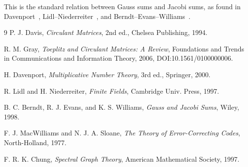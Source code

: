 \documentclass[11pt,a4paper]{article}
\theoremstyle{plain}
\theoremstyle{definition}
\begin{document}
This is the standard relation between Gauss sums and Jacobi sums, as found in
Davenport~\cite[Thm.~11.4]{Davenport}, 
Lidl--Niederreiter~\cite[Thm.~5.15]{LN}, 
and Berndt--Evans--Williams~\cite[Thm.~1.2.1]{Berndt}.


\begin{thebibliography}{9}
P. J. Davis, \emph{Circulant Matrices}, 2nd ed., Chelsea Publishing, 1994.

R. M. Gray, \emph{Toeplitz and Circulant Matrices: A Review}, Foundations and Trends in Communications and Information Theory, 2006, DOI:10.1561/0100000006.

H. Davenport, \emph{Multiplicative Number Theory}, 3rd ed., Springer, 2000.

R. Lidl and H. Niederreiter, \emph{Finite Fields}, Cambridge Univ. Press, 1997.

B. C. Berndt, R. J. Evans, and K. S. Williams, \emph{Gauss and Jacobi Sums}, Wiley, 1998.

F. J. MacWilliams and N. J. A. Sloane, \emph{The Theory of Error-Correcting Codes}, North-Holland, 1977.

F. R. K. Chung, \emph{Spectral Graph Theory}, American Mathematical Society, 1997.
\end{thebibliography}
\end{document}
